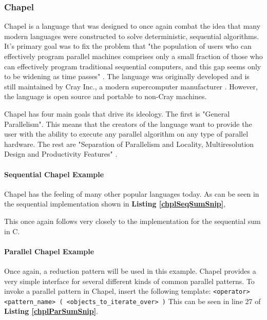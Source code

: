 \documentclass[12pt]{article}
\newcommand{\code}[1]{\lstinline[]{#1}}
\newcommand{\codeRef}[1]{\textbf{Listing \ref{#1}}}
\begin{document}
\subsubsection{Chapel}
Chapel is a language that was designed to once again combat the idea that many modern languages were constructed to solve deterministic, sequential algorithms. It's primary goal was to fix the problem that "the population of users who can effectively program parallel machines comprises only a small fraction of those who can effectively program traditional sequential computers, and this gap seems only to be widening as time passes" \cite{chapel_sage}. The language was originally developed and is still maintained by Cray Inc., a modern supercomputer manufacturer \cite{chapel_cray}. However, the language is open source and portable to non-Cray machines.

Chapel has four main goals that drive its ideology. The first is "General Parallelism". This means that the creators of the language want to provide the user with the ability to execute any parallel algorithm on any type of parallel hardware. The rest are  "Separation of Parallelism and Locality, Multiresolution Design and Productivity Features" \cite{chapel_cray}.

\paragraph{Sequential Chapel Example}

Chapel has the feeling of many other popular languages today. As can be seen in the sequential implementation shown in \codeRef{chplSeqSumSnip}, 



This once again follows very closely to the implementation for the sequential sum in C.

\paragraph{Parallel Chapel Example}

Once again, a reduction pattern will be used in this example. Chapel provides a very simple interface for several different kinds of common parallel patterns. To invoke a parallel pattern in Chapel, insert the following template: \newline \code{<operator> <pattern_name> ( <objects_to_iterate_over> )} \newline This can be seen in line 27 of \codeRef{chplParSumSnip}.
\end{document}
